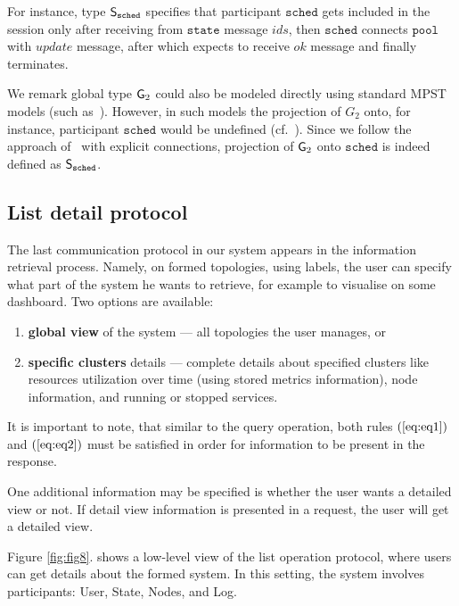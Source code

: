 For instance, type ${\mathsf S}_\mathtt{sched}$ specifies that participant $\mathtt{sched}$ gets included in the session only after receiving from $\mathtt{state}$ message $\mathit{ids}$, then $\mathtt{sched}$ connects $\mathtt{pool}$ with $\mathit{update}$ message, after which expects to receive $\mathit{ok}$ message and finally terminates. 

We remark global type ${\sf G}_2$ could also be modeled directly using standard MPST models (such as~\cite{HondaYC08}). However, in such models the projection of $G_2$ onto, for instance, participant $\mathtt{sched}$ would be undefined (cf.~\cite{HuY17}).
Since we follow the approach of~\cite{HuY17} with explicit connections, projection of ${\sf G}_2$ onto $\mathtt{sched}$ is indeed defined as ${\mathsf S}_\mathtt{sched}$.
%
%
\subsection{List detail protocol}\label{sec:list_detail_protocol}
%
The last communication protocol in our system appears in the information retrieval process. Namely, on formed topologies, using labels, the user can specify what part of the system he wants to retrieve, for example to visualise on some dashboard. Two options are available: 

\begin{enumerate}[start=1,label={(\bfseries \arabic*)}]
	\item \textbf{global view} of the system --- all topologies the user manages, or
	\item \textbf{specific clusters} details --- complete details about specified clusters like resources utilization over time (using stored metrics information), node information, and running or stopped services.
\end{enumerate}
 
It is important to note, that similar to the query operation, both rules $(\ref{eq:eq1})$ and $(\ref{eq:eq2})$ must be satisfied in order for information to be present in the response. 

One additional information may be specified is whether the user wants a detailed view or not. If detail view information is presented in a request, the user will get a detailed view. 

Figure \ref{fig:fig8}. shows a low-level view of the list operation protocol, where users can get details about the formed system. In this setting, the system involves participants: User, State, Nodes, and Log. 

